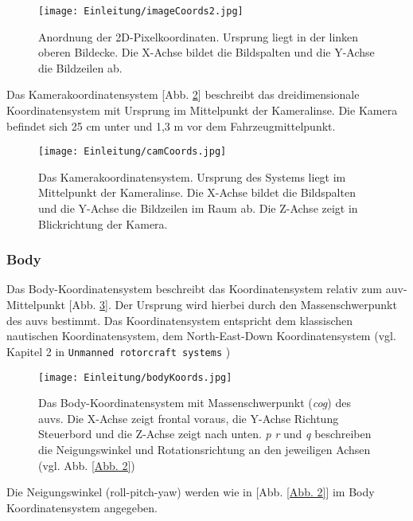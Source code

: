 \begin{figure}[H]
	\centering
	\texttt{[image: Einleitung/imageCoords2.jpg]}
	\caption[Das Bildkoordinatensystem]{Anordnung der 2D-Pixelkoordinaten. Ursprung liegt in der linken oberen Bildecke. Die X-Achse bildet die Bildspalten und die Y-Achse die Bildzeilen ab.}
	\label{imageKoords}
\end{figure}
Das Kamerakoordinatensystem [Abb. \ref{CamKoords}] beschreibt das dreidimensionale Koordinatensystem mit Ursprung im Mittelpunkt der Kameralinse. Die Kamera befindet sich 25 cm unter und 1,3 m vor dem Fahrzeugmittelpunkt.
\begin{figure}[H]
	\centering
	\texttt{[image: Einleitung/camCoords.jpg]}
	\caption[Das Kamerakoordinatensystem]{Das Kamerakoordinatensystem. Ursprung des Systems liegt im Mittelpunkt der Kameralinse. Die X-Achse bildet die Bildspalten und die Y-Achse die Bildzeilen im Raum ab. Die Z-Achse zeigt in Blickrichtung der Kamera.}
	\label{CamKoords}
\end{figure}

\subsubsection{Body}
Das Body-Koordinatensystem beschreibt das Koordinatensystem relativ zum \gls{auv}-Mittelpunkt [Abb. \ref{Abb. 1}].
Der Ursprung wird hierbei durch den Massenschwerpunkt des \gls{auv}s bestimmt.
Das Koordinatensystem entspricht dem klassischen nautischen Koordinatensystem, dem North-East-Down Koordinatensystem (vgl. Kapitel 2 in \texttt{Unmanned rotorcraft systems} \cite{cai2011unmanned})
\begin{figure}[H]
	\centering
	\texttt{[image: Einleitung/bodyKoords.jpg]}
	\caption[Das Body-Koordinatensystem]{Das Body-Koordinatensystem mit Massenschwerpunkt (\textit{cog}) des \gls{auv}s. Die X-Achse zeigt frontal voraus, die Y-Achse Richtung Steuerbord und die Z-Achse zeigt nach unten. \textit{p} \textit{r} und \textit{q} beschreiben die Neigungswinkel und Rotationsrichtung an den jeweiligen Achsen (vgl. Abb. \ref{Abb. 2})}
	\label{Abb. 1}
\end{figure}

Die Neigungswinkel (\gls{roll}-\gls{pitch}-\gls{yaw}) werden wie in [Abb. \ref{Abb. 2}] im Body Koordinatensystem angegeben.

